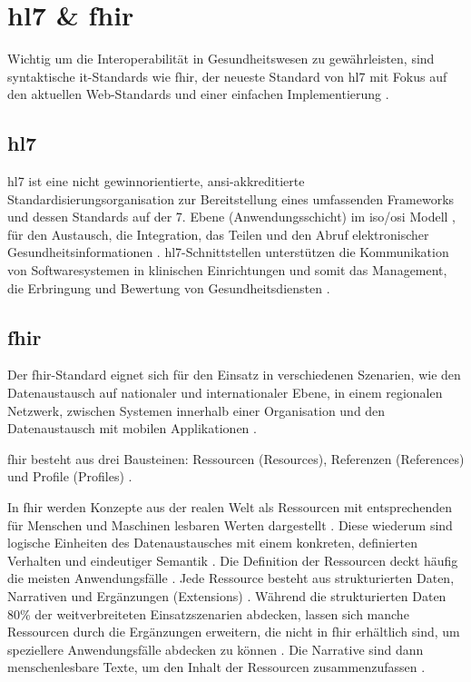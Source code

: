 \section{\acs{hl7} \& \acs{fhir}} \label{sec:hl7fhir}

Wichtig um die Interoperabilität in Gesundheitswesen zu gewährleisten, sind syntaktische \ac{it}-Standards wie \ac{fhir}, der neueste Standard von \ac{hl7} mit Fokus auf den aktuellen Web-Standards und einer einfachen Implementierung \cite{telemedizin, hl7, fhir}.

\subsection{\acs{hl7}} \label{subsec:hl7}

\acf{hl7} ist eine nicht gewinnorientierte, \ac{ansi}-akkreditierte Standardisierungsorganisation zur Bereitstellung eines umfassenden Frameworks und dessen Standards auf der 7. Ebene (Anwendungsschicht) im \ac{iso}/\ac{osi} Modell  
, für den Austausch, die Integration, das Teilen und den Abruf elektronischer Gesundheitsinformationen \cite{telemedizin, ehealtOk, hl7}. \ac{hl7}-Schnittstellen unterstützen die Kommunikation von Softwaresystemen in klinischen Einrichtungen und somit das Management, die Erbringung und Bewertung von Gesundheitsdiensten \cite{ehealtOk, hl7, fhir}.

\subsection{\acs{fhir}} \label{subsec:fhir}

Der \acf{fhir}-Standard eignet sich für den Einsatz in verschiedenen Szenarien, wie den Datenaustausch auf nationaler und internationaler Ebene, in einem regionalen Netzwerk, zwischen Systemen innerhalb einer Organisation und den Datenaustausch mit mobilen Applikationen \cite{ehealtOk, fhir}. 

\ac{fhir} besteht aus drei Bausteinen: Ressourcen (Resources), Referenzen (References) und Profile (Profiles) \cite{fhir}.

In \ac{fhir} werden Konzepte aus der realen Welt als Ressourcen mit entsprechenden für Menschen und Maschinen lesbaren Werten dargestellt \cite{ehealtOk}. Diese wiederum sind logische Einheiten des Datenaustausches mit einem konkreten, definierten Verhalten und eindeutiger Semantik \cite{fhir}. Die Definition der Ressourcen deckt häufig die meisten Anwendungsfälle \cite{ehealtOk}. Jede Ressource besteht aus strukturierten Daten, Narrativen und Ergänzungen (Extensions) \cite{fhir}. Während die strukturierten Daten 80\% der weitverbreiteten Einsatzszenarien abdecken, lassen sich manche Ressourcen durch die Ergänzungen erweitern, die nicht in \ac{fhir} erhältlich sind, um speziellere Anwendungsfälle abdecken zu können \cite{fhir, ehealtOk}. Die Narrative sind dann menschenlesbare Texte, um den Inhalt der Ressourcen zusammenzufassen \cite{fhir}.

